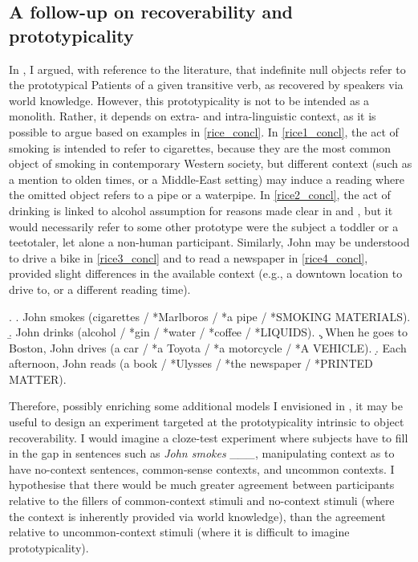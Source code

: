 \subsection{A follow-up on recoverability and prototypicality}

In , I argued, with reference to the literature, that indefinite null objects refer to the prototypical Patients of a given transitive verb, as recovered by speakers via world knowledge. However, this prototypicality is not to be intended as a monolith. Rather, it depends on extra- and intra-linguistic context, as it is possible to argue based on  examples in \ref{rice_concl}. In \ref{rice1_concl}, the act of smoking is intended to refer to cigarettes, because they are the most common object of smoking in contemporary Western society, but different context (such as a mention to olden times, or a Middle-East setting) may induce a reading where the omitted object refers to a pipe or a waterpipe. In \ref{rice2_concl}, the act of drinking is linked to alcohol assumption for reasons made clear in  and , but it would necessarily refer to some other prototype were the subject a toddler or a teetotaler, let alone a non-human participant. Similarly, John may be understood to drive a bike in \ref{rice3_concl} and to read a newspaper in \ref{rice4_concl}, provided slight differences in the available context (e.g., a downtown location to drive to, or a different reading time).

\ex. \label{rice_concl} \a. \label{rice1_concl} John smokes (cigarettes / *Marlboros / *a pipe / *SMOKING MATERIALS).
\b. \label{rice2_concl} John drinks (alcohol / *gin / *water / *coffee / *LIQUIDS).
\c. \label{rice3_concl} When he goes to Boston, John drives (a car / *a Toyota / *a motorcycle / *A VEHICLE).
\d. \label{rice4_concl} Each afternoon, John reads (a book / *Ulysses / *the newspaper / *PRINTED MATTER).

Therefore, possibly enriching some additional models I envisioned in , it may be useful to design an experiment targeted at the prototypicality intrinsic to object recoverability. I would imagine a cloze-test experiment where subjects have to fill in the gap in sentences such as \textit{John smokes \_\_\_}, manipulating context as to have no-context sentences, common-sense contexts, and uncommon contexts. I hypothesise that there would be much greater agreement between participants relative to the fillers of common-context stimuli and no-context stimuli (where the context is inherently provided via world knowledge), than the agreement relative to uncommon-context stimuli (where it is difficult to imagine prototypicality). %

